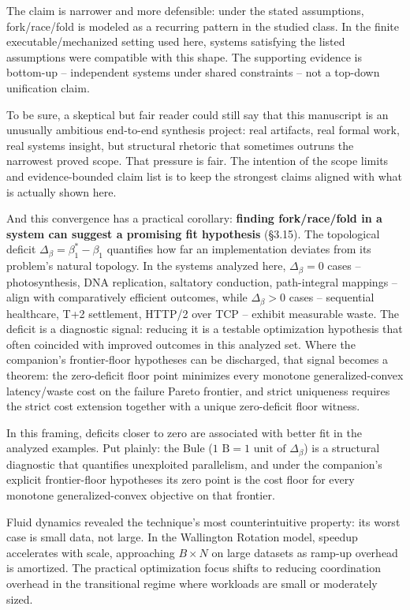 \documentclass[
  11pt,
]{article}
\begin{document}
The claim is narrower and more defensible: under the stated assumptions,
fork/race/fold is modeled as a recurring pattern in the studied class.
In the finite executable/mechanized setting used here, systems
satisfying the listed assumptions were compatible with this shape. The
supporting evidence is bottom-up -- independent systems under shared
constraints -- not a top-down unification claim.

To be sure, a skeptical but fair reader could still say that this
manuscript is an unusually ambitious end-to-end synthesis project: real
artifacts, real formal work, real systems insight, but structural
rhetoric that sometimes outruns the narrowest proved scope. That
pressure is fair. The intention of the scope limits and evidence-bounded
claim list is to keep the strongest claims aligned with what is actually
shown here.

And this convergence has a practical corollary: \textbf{finding
fork/race/fold in a system can suggest a promising fit hypothesis}
(§3.15). The topological deficit \(\Delta_\beta = \beta_1^* - \beta_1\)
quantifies how far an implementation deviates from its problem's natural
topology. In the systems analyzed here, \(\Delta_\beta = 0\) cases --
photosynthesis, DNA replication, saltatory conduction, path-integral
mappings -- align with comparatively efficient outcomes, while
\(\Delta_\beta > 0\) cases -- sequential healthcare, T+2 settlement,
HTTP/2 over TCP -- exhibit measurable waste. The deficit is a diagnostic
signal: reducing it is a testable optimization hypothesis that often
coincided with improved outcomes in this analyzed set. Where the
companion's frontier-floor hypotheses can be discharged, that signal
becomes a theorem: the zero-deficit floor point minimizes every monotone
generalized-convex latency/waste cost on the failure Pareto frontier,
and strict uniqueness requires the strict cost extension together with a
unique zero-deficit floor witness.

In this framing, deficits closer to zero are associated with better fit
in the analyzed examples. Put plainly: the Bule
(\(1 \text{ B} = 1 \text{ unit of } \Delta_\beta\)) is a structural
diagnostic that quantifies unexploited parallelism, and under the
companion's explicit frontier-floor hypotheses its zero point is the
cost floor for every monotone generalized-convex objective on that
frontier.

Fluid dynamics revealed the technique's most counterintuitive property:
its worst case is small data, not large. In the Wallington Rotation
model, speedup accelerates with scale, approaching \(B \times N\) on
large datasets as ramp-up overhead is amortized. The practical
optimization focus shifts to reducing coordination overhead in the
transitional regime where workloads are small or moderately sized.
\end{document}
